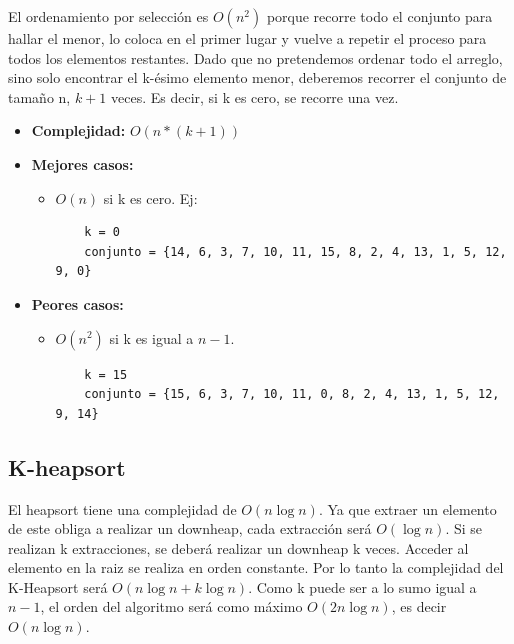 \documentclass[a4paper,10pt]{article}
\begin{document}
El ordenamiento por selección es $O(n^2)$ porque recorre todo el conjunto para hallar el menor, lo coloca en el primer lugar y vuelve a repetir el proceso para todos los elementos restantes. Dado que no pretendemos ordenar todo el arreglo, sino solo encontrar el k-ésimo elemento menor, deberemos recorrer el conjunto de tamaño n, $k+1$ veces. Es decir, si k es cero, se recorre una vez.

\begin{itemize}

\item \textbf{Complejidad:} $O(n*(k+1))$
\item \textbf{Mejores casos:}
	\begin{itemize}
	\item $O(n)$ si k es cero. Ej:
	\begin{verbatim}
	k = 0
	conjunto = {14, 6, 3, 7, 10, 11, 15, 8, 2, 4, 13, 1, 5, 12, 9, 0}
	\end{verbatim}
	\end{itemize}
\item \textbf{Peores casos:}
	\begin{itemize}
	\item $O(n^2)$ si k es igual a $n-1$.
	\begin{verbatim}
	k = 15
	conjunto = {15, 6, 3, 7, 10, 11, 0, 8, 2, 4, 13, 1, 5, 12, 9, 14}
	\end{verbatim}
	\end{itemize}
	
\end{itemize}

\subsection{K-heapsort}

El heapsort tiene una complejidad de $O(n \log{n})$. Ya que extraer un elemento de este obliga a realizar un downheap, cada extracción será $O(\log n)$. Si se realizan k extracciones, se deberá realizar un downheap k veces. Acceder al elemento en la raiz se realiza en orden constante. Por lo tanto la complejidad del K-Heapsort será $O(n \log{n} + k \log{n})$. Como k puede ser a lo sumo igual a $n-1$, el orden del algoritmo será como máximo $O(2n \log{n})$, es decir $O(n \log{n})$.
\end{document}

